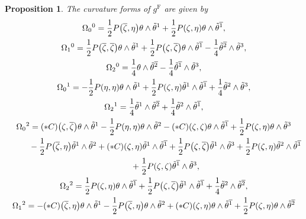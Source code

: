 \documentclass[pdftex]{sigma}
\newcommand\ol{\overline}
\numberwithin{equation}{section}
\newtheorem{Proposition}[Theorem]{Proposition}
 { \theoremstyle{definition}
\newtheorem{Definition}[Theorem]{Definition}
\newtheorem*{Notation}{Notation}
\newtheorem{Example}[Theorem]{Example}
\newtheorem{Remark}[Theorem]{Remark} }
\begin{document}
\begin{Proposition}
The curvature forms of $g^{\mathrm{F}}$ are given by
\begin{gather*}
\Omega_0{}^0=\frac{1}{2}P\bigl(\ol\zeta, \eta\bigr)\theta\wedge\tilde\theta^{1}+\frac{1}{2}P(\zeta, \eta)\theta\wedge\tilde\theta^{\ol1}, \\
\Omega_1{}^0=\frac{1}{2}P\bigl(\ol\zeta, \ol\zeta\bigr)\theta\wedge\tilde\theta^1
 +\frac{1}{2}P\bigl(\zeta, \ol\zeta\bigr)\theta\wedge\tilde\theta^{\ol1}-\frac{1}{4}\tilde\theta^{\ol2}\wedge\tilde\theta^3, \\
 \Omega_2{}^0=\frac{1}{4}\theta\wedge\tilde\theta^{\ol2}-\frac{1}{4}\tilde\theta^{\ol1}\wedge\tilde\theta^3, \\
\Omega_0{}^1=-\frac{1}{2}P(\eta, \eta)\theta\wedge\tilde\theta^1+\frac{1}{2}P(\zeta, \eta)\tilde\theta^1\wedge\tilde\theta^{\ol1}+\frac{1}{4}\tilde\theta^2\wedge\tilde\theta^3, \\
\Omega_2{}^1=\frac{1}{4}\tilde\theta^1\wedge\tilde\theta^{\ol2}+\frac{1}{4}\tilde\theta^2\wedge\tilde\theta^{\ol1}, \\
\Omega_0{}^2=(*C)\bigl(\zeta, \ol\zeta\bigr)\theta\wedge\tilde\theta^1-\frac{1}{2}P(\eta, \eta)\theta\wedge\tilde\theta^2
 -(*C)(\zeta, \zeta)\theta\wedge\tilde\theta^{\ol1}+\frac{1}{2}P(\zeta, \eta)\theta\wedge\tilde\theta^3 \\
\hphantom{\Omega_0{}^2=}{}\hspace{0.2mm}
 -\frac{1}{2}P\bigl(\ol\zeta, \eta\bigr)\tilde\theta^1\wedge\tilde\theta^2
+(*C)(\zeta, \eta)\tilde\theta^1\wedge\tilde\theta^{\ol1}
+\frac{1}{2}P\bigl(\zeta, \ol\zeta\bigr) \tilde\theta^1\wedge\tilde\theta^3
+\frac{1}{2}P(\zeta, \eta)\tilde\theta^2\wedge\tilde\theta^{\ol1}
 \\
\hphantom{\Omega_0{}^2=}{}\hspace{0.2mm}
 +\frac{1}{2}P(\zeta, \zeta)\tilde\theta^{\ol1}\wedge\tilde\theta^3, \\
\Omega_2{}^2=\frac{1}{2}P(\zeta, \eta)\theta\wedge\tilde\theta^{\ol1}+\frac{1}{2}P\bigl(\zeta, \ol\zeta\bigr)\tilde\theta^1\wedge\tilde\theta^{\ol1}+\frac{1}{4}\tilde\theta^2\wedge\tilde\theta^{\ol2}, \\
\Omega_1{}^2=-(*C)\bigl(\ol\zeta, \eta\bigr)\theta\wedge\tilde\theta^1 -\frac{1}{2}P\bigl(\ol\zeta, \eta\bigr)\theta\wedge\tilde\theta^2
+(*C)(\zeta, \eta)\theta\wedge\tilde\theta^{\ol1}
+\frac{1}{2}P(\zeta, \eta)\theta\wedge\tilde\theta^{\ol2}
 \\
\hphantom{\Omega_1{}^2=}{}\hspace{0.2mm}

\end{gather*}
\end{Proposition}
\end{document}

